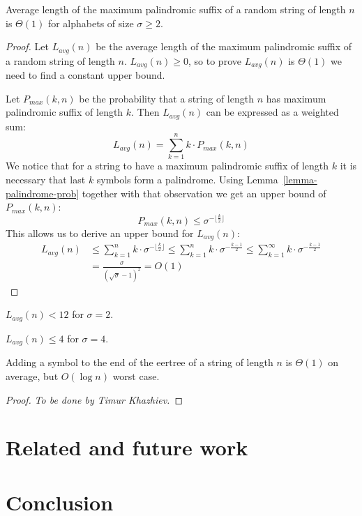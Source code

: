 \begin{theorem}
  Average length of the maximum palindromic suffix
  of a random string of length $n$ is $\Theta(1)$
  for alphabets of size $\sigma \ge 2$.
\end{theorem}
\begin{proof}
  Let $L_{avg}(n)$ be the average length of the maximum palindromic suffix
  of a random string of length $n$.
  $L_{avg}(n) \ge 0$, so to prove $L_{avg}(n)$ is $\Theta(1)$ we need
  to find a constant upper bound.

  Let $P_{max}(k, n)$ be the probability that a string of length $n$
  has maximum palindromic suffix of length $k$.
  Then $L_{avg}(n)$ can be expressed as a weighted sum:
  $$
  L_{avg}(n) = \sum_{k=1}^{n} k \cdot P_{max}(k, n)
  $$
  We notice that for a string to have a maximum palindromic suffix
  of length $k$ it is necessary that last $k$ symbols form a palindrome.
  Using Lemma~\ref{lemma-palindrome-prob} together with that observation
  we get an upper bound of $P_{max}(k, n)$:
  $$
  P_{max}(k, n) \le \sigma^{- \lfloor\frac{k}{2}\rfloor}
  $$
  This allows us to derive an upper bound for $L_{avg}(n)$:
  \begin{align*}
    L_{avg}(n)
      &\le \sum_{k=1}^{n} k \cdot \sigma^{- \lfloor\frac{k}{2}\rfloor}
       \le \sum_{k=1}^{n} k \cdot \sigma^{- \frac{k-1}{2}}
       \le \sum_{k=1}^{\infty} k \cdot \sigma^{- \frac{k-1}{2}} \\
      &= \frac{\sigma}{(\sqrt{\sigma} - 1)^2}
       = O(1)
  \end{align*}
\end{proof}

\begin{corollary}
  $L_{avg}(n) < 12$ for $\sigma = 2$.
\end{corollary}

\begin{corollary}
  $L_{avg}(n) \le 4$ for $\sigma = 4$.
\end{corollary}

\begin{theorem}
  Adding a symbol to the end of the eertree of
  a string of length $n$ is $\Theta(1)$ on average,
  but $O(\log{}n)$ worst case.
\end{theorem}
\begin{proof}
  \emph{To be done by Timur Khazhiev.}
\end{proof}

\section{Related and future work}

\section{Conclusion}

